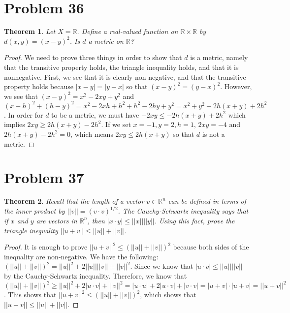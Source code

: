 \documentclass[psamsfonts]{amsart}
\newtheorem{thm}{Theorem}[section]
\theoremstyle{definition}
\theoremstyle{remark}
\numberwithin{equation}{section}
\begin{document}
\section{Problem 36}

\begin{thm}
Let $X = \mathbb{R}$. Define a real-valued function on $\mathbb{R} \times \mathbb{R}$ by $d(x,y) = (x-y)^2$. Is $d$ a metric on $\mathbb{R}$?
\end{thm}

\begin{proof}
We need to prove three things in order to show that $d$ is a metric, namely that the transitive property holds, the triangle inequality holds, and that it is nonnegative. First, we see that it is clearly non-negative, and that the transitive property holds because $|x - y| = |y - x|$ so that $(x-y)^2 = (y - x)^2$. However, we see that $(x-y)^2 = x^2 - 2xy + y^2$ and $(x-h)^2 + (h-y)^2 = x^2 - 2xh + h^2 + h^2 - 2hy + y^2 = x^2 + y^2 - 2h(x + y) + 2h^2$. In order for $d$ to be a metric, we must have $-2xy \leq -2h(x+y) + 2h^2$ which implies $2xy \geq 2h(x+y) - 2h^2$. If  we set $x = -1, y =2, h= 1$, $2xy = -4$ and $2h(x+y) - 2h^2 = 0$, which means $2xy \leq 2h(x+y)$ so that $d$ is not a metric. 
\end{proof}

\section{Problem 37}

\begin{thm}
Recall that the length of a vector $v \in \mathbb{R}^n$ can be defined in terms of the inner product by $|| v || = (v \cdot v)^{1/2}$. The Cauchy-Schwartz inequality says that if $x$ and $y$ are vectors in $\mathbb{R}^n$, then $|x \cdot y| \leq ||x || ||y||$. Using this fact, prove the triangle inequality $||u + v || \leq ||u || + || v ||$. 
\end{thm}

\begin{proof} 
It is enough to prove $|| u + v ||^2 \leq (||u|| + ||v||)^2 $ because both sides of the inequality are non-negative. We have the following: $(||u|| + ||v||)^2 = ||u||^2 + 2 ||u|| ||v|| + ||v||^2$. Since we know that $|u \cdot v| \leq ||u || ||v||$ by the Cauchy-Schwartz inequality. Therefore, we know that $( ||u|| + ||v||)^2 \geq ||u||^2 + 2 |u \cdot v| + ||v||^2 = |u \cdot u| + 2 |u \cdot v| + |v \cdot v| = | u + v| \cdot | u + v| = ||u + v||^2$. This shows that $|| u + v ||^2 \leq (||u|| + ||v||)^2$, which shows that $||u+v|| \leq ||u|| + ||v||$. 
\end{proof}
\end{document}
